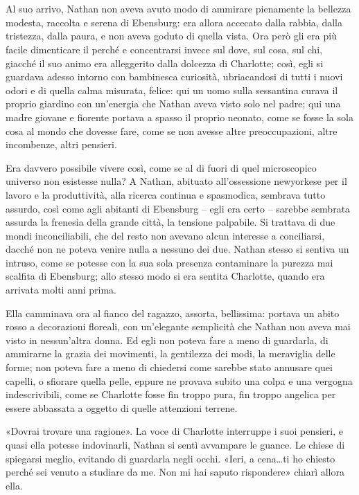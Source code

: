 \chapter{}
\label{ch:3}

Al suo arrivo, Nathan non aveva avuto modo di ammirare pienamente la bellezza modesta, raccolta e
serena di Ebensburg: era allora accecato dalla rabbia, dalla tristezza, dalla paura, e non aveva
goduto di quella vista. Ora però gli era più facile dimenticare il perché e concentrarsi invece sul
dove, sul cosa, sul chi, giacché il suo animo era alleggerito dalla dolcezza di Charlotte; così,
egli si guardava adesso intorno con bambinesca curiosità, ubriacandosi di tutti i nuovi odori e di
quella calma misurata, felice: qui un uomo sulla sessantina curava il proprio giardino con
un'energia che Nathan aveva visto solo nel padre; qui una madre giovane e fiorente portava a spasso
il proprio neonato, come se fosse la sola cosa al mondo che dovesse fare, come se non avesse altre
preoccupazioni, altre incombenze, altri pensieri.

Era davvero possibile vivere così, come se al di fuori di quel microscopico universo non esistesse
nulla? A Nathan, abituato all'ossessione newyorkese per il lavoro e la produttività, alla ricerca
continua e spasmodica, sembrava tutto assurdo, così come agli abitanti di Ebensburg -- egli era
certo -- sarebbe sembrata assurda la frenesia della grande città, la tensione palpabile. Si trattava
di due mondi inconciliabili, che del resto non avevano alcun interesse a conciliarsi, dacché non ne
poteva venire nulla a nessuno dei due. Nathan stesso si sentiva un intruso, come se potesse con la
sua sola presenza contaminare la purezza mai scalfita di Ebensburg; allo stesso modo si era sentita
Charlotte, quando era arrivata molti anni prima.

Ella camminava ora al fianco del ragazzo, assorta, bellissima: portava un abito rosso a decorazioni
floreali, con un'elegante semplicità che Nathan non aveva mai visto in nessun'altra donna. Ed egli
non poteva fare a meno di guardarla, di ammirarne la grazia dei movimenti, la gentilezza dei modi,
la meraviglia delle forme; non poteva fare a meno di chiedersi come sarebbe stato annusare quei
capelli, o sfiorare quella pelle, eppure ne provava subito una colpa e una vergogna indescrivibili,
come se Charlotte fosse fin troppo pura, fin troppo angelica per essere abbassata a oggetto di
quelle attenzioni terrene.

«Dovrai trovare una ragione». La voce di Charlotte interruppe i suoi pensieri, e quasi ella potesse
indovinarli, Nathan si sentì avvampare le guance. Le chiese di spiegarsi meglio, evitando di
guardarla negli occhi. «Ieri, a cena\dots ti ho chiesto perché sei venuto a studiare da me. Non mi
hai saputo rispondere» chiarì allora ella.

